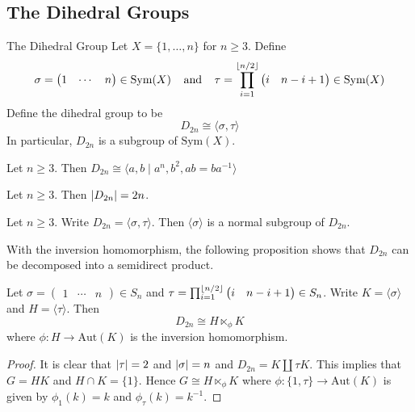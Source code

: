 \documentclass[a4paper]{article}
\begin{document}
\subsection{The Dihedral Groups}
\begin{defn}{The Dihedral Group}{} Let $X=\{1,\dots,n\}$ for $n\geq 3$. Define $$\sigma=\begin{pmatrix}1 & \cdots &  n\end{pmatrix}\in\text{Sym}(X)\text{\;\;\;\;and\;\;\;\;}\tau=\prod_{i=1}^{\lfloor n/2\rfloor}\begin{pmatrix}i & n-i+1\end{pmatrix}\in\text{Sym}(X)$$ Define the dihedral group to be $$D_{2n}\cong\langle\sigma,\tau\rangle$$ In particular, $D_{2n}$ is a subgroup of $\text{Sym}(X)$. 
\end{defn}

\begin{prp}{}{} Let $n\geq 3$. Then $D_{2n}\cong\langle a,b\;|\;a^n, b^2, ab=ba^{-1}\rangle$
\end{prp}

\begin{prp}{}{} Let $n\geq 3$. Then $\abs{D_{2n}}=2n$. 
\end{prp}

\begin{prp}{}{} Let $n\geq 3$. Write $D_{2n}=\langle\sigma,\tau\rangle$. Then $\langle\sigma\rangle$ is a normal subgroup of $D_{2n}$. 
\end{prp}

With the inversion homomorphism, the following proposition shows that $D_{2n}$ can be decomposed into a semidirect product. 

\begin{prp}{}{} Let $\sigma=\begin{pmatrix}1 & \cdots &  n\end{pmatrix}\in S_n$ and $\tau=\prod_{i=1}^{\lfloor n/2\rfloor}\begin{pmatrix}i & n-i+1\end{pmatrix}\in S_n$. Write $K=\langle\sigma\rangle$ and $H=\langle\tau\rangle$. Then $$D_{2n}\cong H\ltimes_\phi K$$ where $\phi:H\to\text{Aut}(K)$ is the inversion homomorphism. 
\begin{proof}
It is clear that $\abs{\tau}=2$ and $\abs{\sigma}=n$ and $D_{2n}=K\amalg\tau K$. This implies that $G=HK$ and $H\cap K=\{1\}$. Hence $G\cong H\ltimes_\phi K$ where $\phi:\{1,\tau\}\to\text{Aut}(K)$ is given by $\phi_1(k)=k$ and $\phi_{\tau}(k)=k^{-1}$. 
\end{proof}
\end{prp}
\end{document}
